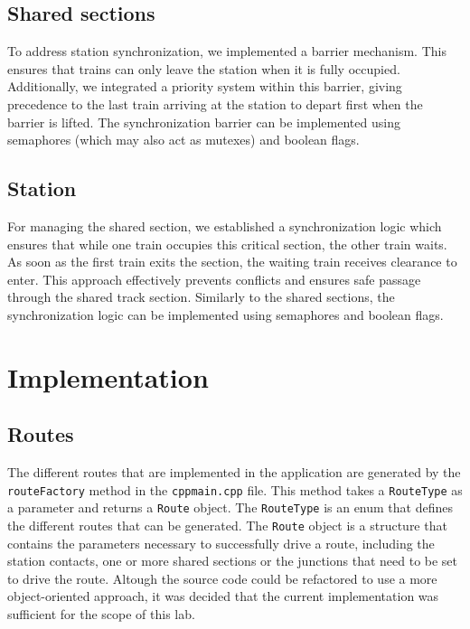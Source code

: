 \documentclass{article}
\begin{document}
    \subsection{Shared sections}
    To address station synchronization, we implemented a barrier mechanism. This ensures that trains can only leave the station when it is fully occupied. Additionally, we integrated a priority system within this barrier, giving precedence to the last train arriving at the station to depart first when the barrier is lifted. The synchronization barrier can be implemented using semaphores (which may also act as mutexes) and boolean flags.

    \subsection{Station}
    For managing the shared section, we established a synchronization logic which ensures that while one train occupies this critical section, the other train waits. As soon as the first train exits the section, the waiting train receives clearance to enter. This approach effectively prevents conflicts and ensures safe passage through the shared track section. Similarly to the shared sections, the synchronization logic can be implemented using semaphores and boolean flags.

    \newpage


    \section{Implementation}

    \subsection{Routes}

    The different routes that are implemented in the application are generated by the \texttt{routeFactory} method in the \texttt{cppmain.cpp} file. This method takes a \texttt{RouteType} as a parameter and returns a \texttt{Route} object. The \texttt{RouteType} is an enum that defines the different routes that can be generated. The \texttt{Route} object is a structure that contains the parameters necessary to successfully drive a route, including the station contacts, one or more shared sections or the junctions that need to be set to drive the route. Altough the source code could be refactored to use a more object-oriented approach, it was decided that the current implementation was sufficient for the scope of this lab.
\end{document}

